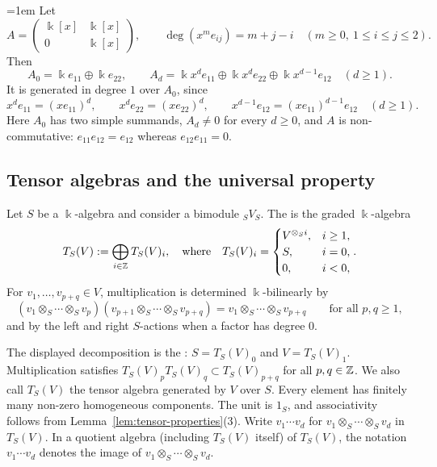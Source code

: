 \begin{supplementary}
\begin{example}\label{ex:triangular-polynomials}
\emergencystretch=1em
Let
\[
A=\begin{pmatrix}\Bbbk[x]&\Bbbk[x]\\0&\Bbbk[x]\end{pmatrix},
\qquad \deg(x^m e_{ij})=m+j-i
\quad(m\geq0,\ 1\leq i\leq j\leq2).
\]
Then
\[
A_0=\Bbbk e_{11}\oplus\Bbbk e_{22},\qquad
A_d=\Bbbk x^d e_{11}\oplus\Bbbk x^d e_{22}\oplus\Bbbk x^{d-1}e_{12}
\quad(d\geq1).
\]
It is generated in degree $1$ over $A_0$, since
\[
x^d e_{11}=(xe_{11})^d,\qquad
x^d e_{22}=(xe_{22})^d,\qquad
x^{d-1}e_{12}=(xe_{11})^{d-1}e_{12}
\quad(d\geq1).
\]
Here $A_0$ has two simple summands, $A_d\neq0$ for every $d\geq0$, and $A$ is non-commutative: $e_{11}e_{12}=e_{12}$ whereas $e_{12}e_{11}=0$.
\end{example}
\end{supplementary}

\subsection{Tensor algebras and the universal property}


\begin{definition}\label{def:tensor-algebra}
Let $S$ be a $\Bbbk$-algebra and consider a bimodule ${}_SV_S$.
The  is the graded $\Bbbk$-algebra
\[
T_S(V):=\bigoplus_{i\in\mathbb{Z}}T_S(V)_i,
\quad\text{where}\quad
T_S(V)_i=
\begin{cases}
V^{\otimes_S i},&i\geq1,\\
S,&i=0,\\
0,&i<0,
\end{cases}.
\]
For $v_1,\ldots,v_{p+q}\in V$, multiplication is determined $\Bbbk$-bilinearly by
\[
(v_1\otimes_S\cdots\otimes_S v_p)(v_{p+1}\otimes_S\cdots\otimes_S v_{p+q})
=v_1\otimes_S\cdots\otimes_S v_{p+q}
\qquad\text{for all }p,q\geq1,
\]
and by the left and right $S$-actions when a factor has degree $0$.
\end{definition}

The displayed decomposition is the : $S=T_S(V)_0$ and $V=T_S(V)_1$.
Multiplication satisfies $T_S(V)_pT_S(V)_q\subset T_S(V)_{p+q}$ for all $p,q\in\mathbb{Z}$.
We also call $T_S(V)$ the tensor algebra generated by $V$ over $S$.
Every element has finitely many non-zero homogeneous components.
The unit is $1_S$, and associativity follows from Lemma~\ref{lem:tensor-properties}(3).
Write $v_1\cdots v_d$ for $v_1\otimes_S\cdots\otimes_S v_d$ in $T_S(V)$.
In a quotient algebra (including $T_S(V)$ itself) of $T_S(V)$, the notation $v_1\cdots v_d$ denotes the image of $v_1\otimes_S\cdots\otimes_S v_d$.


